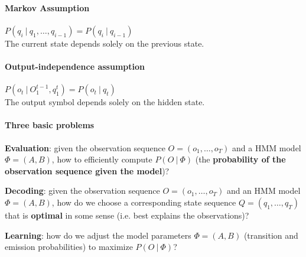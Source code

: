 \documentclass[10pt]{report}
\begin{document}
\paragraph{Markov Assumption} $P(q_i\:|\:q_1,\ldots,q_{i-1}) = P(q_i\:|\:q_{i-1})$\\
The current state depends solely on the previous state.
\paragraph{Output-independence assumption} $P(o_t\:|\:O_1^{t-1},q_1^t) = P(o_t\:|\:q_t)$\\
The output symbol depends solely on the hidden state.
\paragraph{Three basic problems}
\begin{list}{}{}
	\item \textbf{Evaluation}: given the observation sequence $O = (o_1,\ldots,o_T)$ and a HMM model $\Phi = (A, B)$, how to efficiently compute $P(O\:|\:\Phi)$ (the \textbf{probability of the observation sequence given the model})?
	\item \textbf{Decoding}: given the observation sequence $O = (o_1,\ldots,o_T)$ and an HMM model $\Phi = (A, B)$, how do we choose a corresponding state sequence $Q = (q_1,\ldots,q_T)$ that is \textbf{optimal} in some sense (i.e. best explains the observations)?
	\item \textbf{Learning}: how do we adjust the model parameters $\Phi = (A,B)$ (transition and emission probabilities) to maximize $P(O\:|\:\Phi)$?
\end{list}
\end{document}
